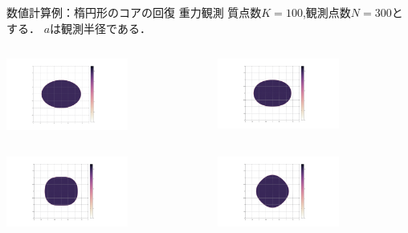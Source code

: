 \documentclass[dvipdfmx]{beamer}
\theoremstyle{remark}
\begin{document}
\begin{frame}{数値計算例：楕円形のコアの回復 重力観測}
  質点数$K=100$,観測点数$N=300$とする．
  $a$は観測半径である．

  \begin{columns}
    \begin{column}{0.38\columnwidth}
      \centering
      \includegraphics[width=4cm]{fig/elliptic.png}
      \captionsetup[figure]{labelformat=empty,labelsep=none}
    \end{column}
    \hspace{-1cm}
    \begin{column}{0.38\columnwidth}
      \centering
      \includegraphics[width=4cm]{fig2/GN300K100R10E2.png}
      \captionsetup[figure]{labelformat=empty,labelsep=none}
    \end{column}
  \end{columns}

  \begin{columns}
    \begin{column}{0.38\columnwidth}
      \centering
      \includegraphics[width=4cm]{fig2/GN300K100R30E2.png}
      \captionsetup[figure]{labelformat=empty,labelsep=none}
    \end{column}
    \hspace{-1cm}
    \begin{column}{0.38\columnwidth}
      \centering
      \includegraphics[width=4cm]{fig2/GN300K100R100E2.png}
      \captionsetup[figure]{labelformat=empty,labelsep=none}
    \end{column}
  \end{columns}


\end{frame}
\end{document}
